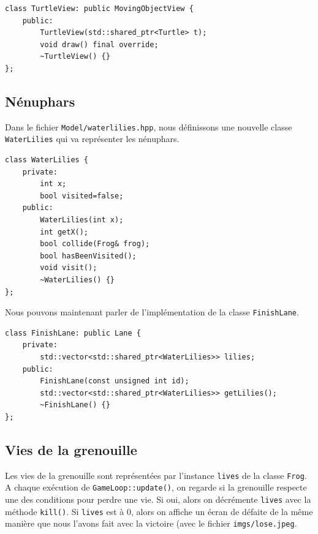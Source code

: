 \documentclass[a4paper, 12pt]{article}
\begin{document}
\begin{lstlisting}
class TurtleView: public MovingObjectView {
    public:
        TurtleView(std::shared_ptr<Turtle> t);
        void draw() final override;
        ~TurtleView() {}
};
\end{lstlisting}

\subsection{Nénuphars} \label{lilies}

Dans le fichier \texttt{Model/waterlilies.hpp}, nous définissons une nouvelle classe \texttt{WaterLilies} qui va représenter les nénuphars. \\

\begin{lstlisting}
class WaterLilies {
    private:
        int x;
        bool visited=false;
    public:
        WaterLilies(int x);
        int getX();
        bool collide(Frog& frog);
        bool hasBeenVisited();
        void visit();
        ~WaterLilies() {}
};
\end{lstlisting} \hspace{0.5cm}

Nous pouvons maintenant parler de l'implémentation de la classe \texttt{FinishLane}. \\

\begin{lstlisting}
class FinishLane: public Lane {
    private:
        std::vector<std::shared_ptr<WaterLilies>> lilies;
    public:
        FinishLane(const unsigned int id);
        std::vector<std::shared_ptr<WaterLilies>> getLilies();
        ~FinishLane() {}
};
\end{lstlisting} \hspace{0.5cm}

\subsection{Vies de la grenouille} \label{lives}

Les vies de la grenouille sont représentées par l'instance \texttt{lives} de la classe \texttt{Frog}. A chaque exécution de 
\texttt{GameLoop::update()}, on regarde si la grenouille respecte une des conditions pour perdre une vie. Si oui, alors on décrémente \texttt{lives} avec la méthode \texttt{kill()}. Si \texttt{lives} est à 0, alors on affiche un écran de défaite de la même manière que nous l'avons fait avec la victoire (avec le fichier \texttt{imgs/lose.jpeg}. \\
\end{document}
